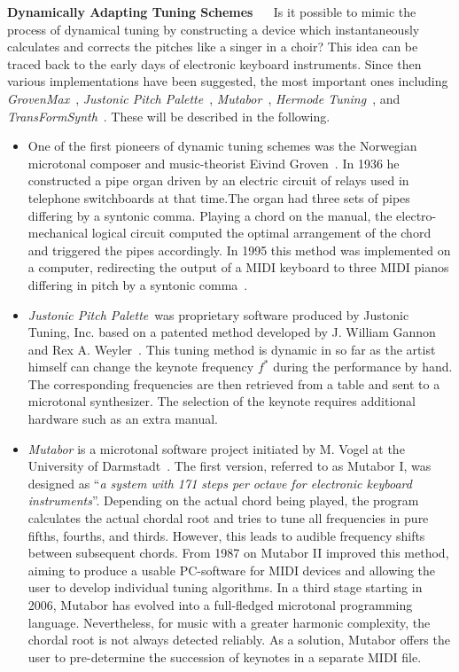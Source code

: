 \noindent\textbf{Dynamically Adapting Tuning Schemes}
~\newline~\newline
Is it possible to mimic the process of dynamical tuning by constructing a device which instantaneously calculates and corrects the pitches like a singer in a choir? This idea can be traced back to the early days of electronic keyboard instruments. Since then various implementations have been suggested, the most important ones including \textit{GrovenMax}~\cite{GrovenMax}, \textit{Justonic Pitch Palette}\texttrademark~\cite{Justonic}, \textit{Mutabor}~\cite{Mutabor}, \textit{Hermode Tuning}\texttrademark~\cite{Hermode}, and \textit{TransFormSynth}~\cite{Sethares}. These will be described in the following.

\begin{itemize}
\item One of the first pioneers of dynamic tuning schemes was the Norwegian microtonal composer and music-theorist Eivind Groven~\cite{GrovenMax}. In 1936 he constructed a pipe organ driven by an electric circuit of relays used in telephone switchboards at that time.The organ had three sets of pipes differing by a syntonic comma. Playing a chord on the manual, the electro-mechanical logical circuit computed the optimal arrangement of the chord and triggered the pipes accordingly. In 1995 this method was implemented on a computer, redirecting the output of a MIDI keyboard to three MIDI pianos differing in pitch by a syntonic comma~\cite{Premiere}.

\item\textit{Justonic Pitch Palette}\texttrademark ~was proprietary software produced by Justonic Tuning, Inc. based on a patented method developed by J. William Gannon and Rex A. Weyler~\cite{Justonic}. This tuning method is dynamic in so far as the artist himself can change the keynote frequency $f^*$ during the performance by hand. The corresponding frequencies are then retrieved from a table and sent to a microtonal synthesizer. The selection of the keynote requires additional hardware such as an extra manual.

\item\textit{Mutabor} is a microtonal software project initiated by M. Vogel at the University of Darmstadt~\cite{Mutabor}. The first version, referred to as Mutabor I, was designed as ``\textit{a system with 171 steps per octave for electronic keyboard instruments}''. Depending on the actual chord being played, the program calculates the actual chordal root and tries to tune all frequencies in pure fifths, fourths, and thirds. However, this leads to audible frequency shifts between subsequent chords. From 1987 on Mutabor II improved this method, aiming to produce a usable PC-software for MIDI devices and allowing the user to develop individual tuning algorithms. In a third stage starting in 2006, Mutabor has evolved into a full-fledged microtonal programming language. Nevertheless, for music with a greater harmonic complexity, the chordal root is not always detected reliably. As a solution, Mutabor offers the user to pre-determine the succession of keynotes in a separate MIDI file.


\end{itemize}
